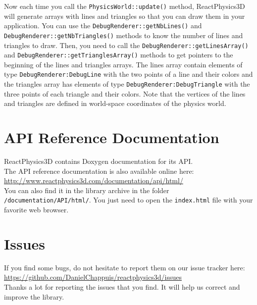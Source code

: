 \documentclass[a4paper,12pt]{article}
\begin{document}
   \vspace{0.6cm}

  \begin{sloppypar}
    Now each time you call the \texttt{PhysicsWorld::update()} method, ReactPhysics3D will generate arrays with lines and triangles so that you can
    draw them in your application. You can use the \texttt{DebugRenderer::getNbLines()} and \texttt{DebugRenderer::getNbTriangles()} methods to know
    the number of lines and triangles to draw. Then, you need to call the \texttt{DebugRenderer::getLinesArray()} and
    \texttt{DebugRenderer::getTrianglesArray()} methods to get pointers to the beginning of the lines and triangles arrays. The lines array contain
    elements of type \texttt{DebugRenderer:DebugLine} with the two points of a line and their colors and the triangles array has elements of
    type \texttt{DebugRenderer:DebugTriangle} with the three points of each triangle and their colors. Note that the vertices of the lines and triangles
    are defined in world-space coordinates of the physics world.
  \end{sloppypar}

   \section{API Reference Documentation}

   ReactPhysics3D contains Doxygen documentation for its API. \\

   The API reference documentation is also available online here: \url{http://www.reactphysics3d.com/documentation/api/html/} \\

   You can also find it in the library archive in the folder \texttt{/documentation/API/html/}. You just
   need to open the \texttt{index.html} file with your favorite web browser. 

   \section{Issues}

   If you find some bugs, do not hesitate to report them on our issue tracker here: \\

   \url{https://github.com/DanielChappuis/reactphysics3d/issues} \\

   Thanks a lot for reporting the issues that you find. It will help us correct and improve the library.
\end{document}
